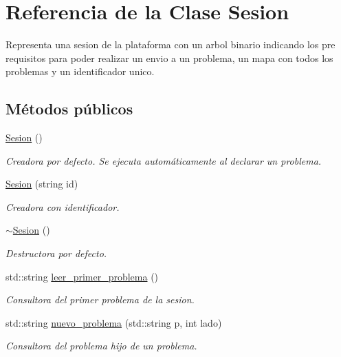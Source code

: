 \hypertarget{class_sesion}{}\section{Referencia de la Clase Sesion}
\label{class_sesion}


Representa una sesion de la plataforma con un arbol binario indicando los pre requisitos para poder realizar un envio a un problema, un mapa con todos los problemas y un identificador unico.  


\subsection*{Métodos públicos}
\begin{DoxyCompactItemize}
\item 
\mbox{\hyperlink{class_sesion_adf5a84efa8e2629b30ad89df74cfc0a2}{Sesion}} ()
\begin{DoxyCompactList}\small\item\em Creadora por defecto. Se ejecuta automáticamente al declarar un problema. \end{DoxyCompactList}\item 
\mbox{\hyperlink{class_sesion_a1b7a01575ed1e5a4d05765195dcfc189}{Sesion}} (string id)
\begin{DoxyCompactList}\small\item\em Creadora con identificador. \end{DoxyCompactList}\item 
\mbox{\hyperlink{class_sesion_acc4bd3e753a45d6b7a01aa27fb8f171f}{$\sim$\+Sesion}} ()
\begin{DoxyCompactList}\small\item\em Destructora por defecto. \end{DoxyCompactList}\item 
std\+::string \mbox{\hyperlink{class_sesion_a77b0408b1dba7df9a090e84ae9d56cba}{leer\+\_\+primer\+\_\+problema}} ()
\begin{DoxyCompactList}\small\item\em Consultora del primer problema de la sesion. \end{DoxyCompactList}\item 
std\+::string \mbox{\hyperlink{class_sesion_aee7122e6303e811527e894a0f2d08fea}{nuevo\+\_\+problema}} (std\+::string p, int lado)
\begin{DoxyCompactList}\small\item\em Consultora del problema hijo de un problema. \end{DoxyCompactList}\item 

\end{DoxyCompactItemize}
